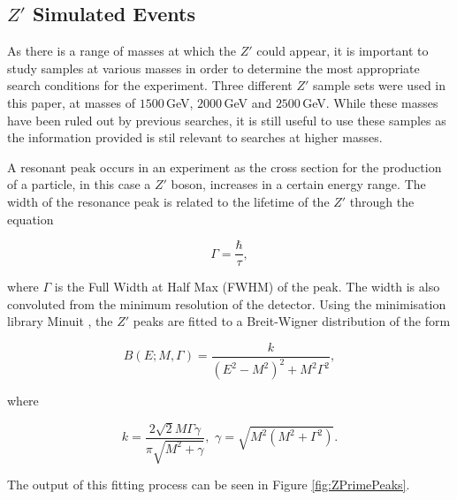 \documentclass{article}
\begin{document}
\subsection{$Z'$ Simulated Events}
 
As there is a range of masses at which the $Z'$ could appear, it is important to study samples at various masses in order to determine the most appropriate search conditions for the experiment. Three different $Z'$ sample sets were used in this paper, at masses of $1500\,$GeV, $2000\,$GeV and $2500\,$GeV. While these masses have been ruled out by previous searches, it is still useful to use these samples as the information provided is stil relevant to searches at higher masses. 

A resonant peak occurs in an experiment as the cross section for the production of a particle, in this case a $Z'$ boson, increases in a certain energy range. The width of the resonance peak is related to the lifetime of the $Z'$ through the equation 

\begin{equation}
\Gamma = \frac{\hbar}{\tau},
\end{equation}

where $\Gamma$ is the Full Width at Half Max (FWHM) of the peak. The width is also convoluted from the minimum resolution of the detector.
Using the minimisation library Minuit \cite{Minuit}, the $Z'$ peaks are fitted to a Breit-Wigner distribution of the form

\begin{equation}
B(E;M,\Gamma) = \frac{k}{(E^2 - M^2)^2 + M^2\Gamma^2},
\end{equation}

where 

\begin{equation}
k = \frac{2\sqrt{2}M\Gamma\gamma}{\pi\sqrt{M^2 + \gamma}}, \,\, \gamma = \sqrt{M^2(M^2 + \Gamma^2)}.
\end{equation}

The output of this fitting process can be seen in Figure \ref{fig:ZPrimePeaks}.
\end{document}
